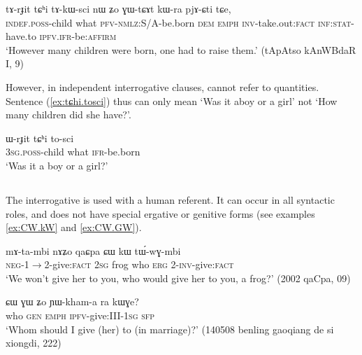 \begin{exe}
\ex \label{ex:tɕhi.tAkWsci}
\gll  
tɤ-rɟit tɕʰi tɤ-kɯ-sci nɯ ʑo ɣɯ-tɕɤt kɯ-ra pjɤ-ɕti tɕe,   \\
\textsc{indef.poss}-child what \textsc{pfv-nmlz:S/A}-be.born \textsc{dem} \textsc{emph} \textsc{inv}-take.out:\textsc{fact} \textsc{inf:stat}-have.to \textsc{ipfv.ifr}-be:\textsc{affirm} \\
\glt `However many children were born, one had to raise them.' (tApAtso kAnWBdaR I, 9)
\end{exe}  

However, in independent interrogative clauses,  cannot refer to quantities. Sentence (\ref{ex:tɕhi.tosci}) thus can only mean `Was it aboy or a girl' not `How many children did she have?'.

\begin{exe}
\ex \label{ex:tɕhi.tosci}
\gll  ɯ-rɟit tɕʰi to-sci \\
\textsc{3sg.poss}-child what \textsc{ifr}-be.born \\
\glt `Was it a boy or a girl?'
\end{exe}  

\subsection{}
The interrogative  is used with a human referent. It can occur in all syntactic roles, and does not have special ergative or genitive forms (see examples \ref{ex:CW.kW} and \ref{ex:CW.GW}).

\begin{exe}
\ex  \label{ex:CW.kW}
\gll  mɤ-ta-mbi 	nɤʑo 	qaɕpa 	ɕɯ 	kɯ 	tɯ́-wɣ-mbi    \\
\textsc{neg}-1$\rightarrow$2-give:\textsc{fact} \textsc{2sg} frog who \textsc{erg} 2-\textsc{inv}-give:\textsc{fact}  \\
\glt `We won't give her to you, who would give her to you, a frog?'   (2002 qaCpa, 09)
\end{exe} 

 
\begin{exe}
\ex  \label{ex:CW.GW}
\gll  ɕɯ ɣɯ ʑo ɲɯ-kham-a ra kɯɣe?    \\
who \textsc{gen} \textsc{emph} \textsc{ipfv}-give:III-\textsc{1sg} \textsc{sfp} \\
\glt `Whom should I give (her) to (in marriage)?' (140508 benling gaoqiang de si xiongdi, 222)
\end{exe}  

